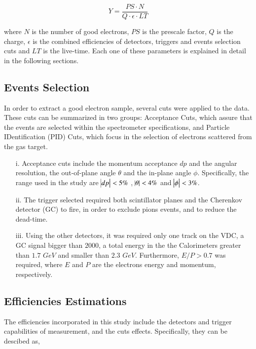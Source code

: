 \documentclass[preprint,12pt]{elsarticle}
\begin{document}
\begin{equation}
Y = \frac{PS \cdot N}{ Q \cdot \epsilon \cdot LT }
\label{eq:yield}
\end{equation}

\noindent where $N$ is the number of good electrons, $PS$ is the prescale factor, $Q$ is the charge, $\epsilon $ is the combined efficiencies of detectors, triggers and events selection cuts and $LT$ is the live-time. Each one of these parameters is explained in detail in the following sections.

\subsection{Events Selection}
In order to extract a good electron sample, several cuts were applied to the data. These cuts can be summarized in two groups: Acceptance Cuts, which assure that the events are selected within the spectrometer specifications, and Particle IDentification (PID) Cuts, which focus in the selection of electrons scattered from the gas target. 

\begin{itemize}
\item[i.]Acceptance cuts include the momentum acceptance $dp$ and the angular resolution, the out-of-plane angle $\theta $ and the in-plane angle $\phi $. Specifically, the range used in the study are $\abs{dp} < 5  \% $ ,  $\abs{ \theta } < 4  \% $ and $\abs{\phi } < 3 \% $.

\item[ii.] The trigger selected required both scintillator planes and the Cherenkov detector (GC) to fire, in order to exclude pions events, and to reduce the dead-time.

\item[iii.]Using the other detectors, it was required only one track on the VDC, a GC signal bigger than $2000$, a total energy in the the Calorimeters greater than $1.7$ $GeV$  and smaller than $2.3$ $GeV$. Furthermore,  $E/P>0.7$ was required, where $E$ and $P$ are the electrons energy and momentum, respectively.
\end{itemize}

\subsection{Efficiencies Estimations } 

The efficiencies incorporated in this study include the detectors and trigger capabilities of measurement, and the cuts effects. Specifically, they can be descibed as, 
\end{document}

